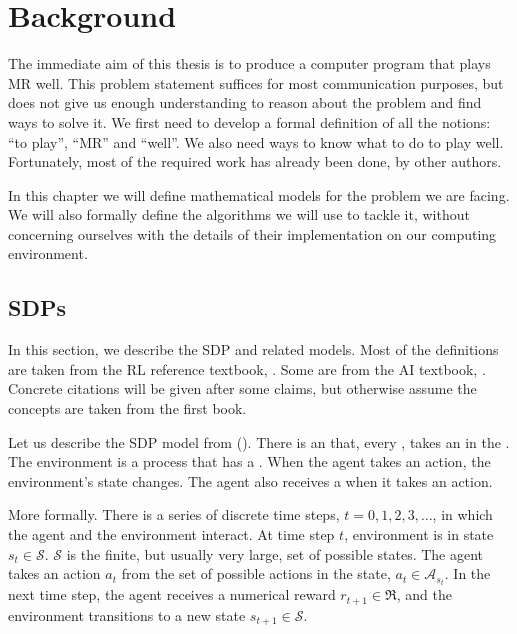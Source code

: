 \chapter{Background}
The immediate aim of this thesis is to produce a computer program that plays
\acl{MR} well. This problem statement suffices for most communication purposes,
but does not give us enough understanding to reason about the problem and find
ways to solve it. We first need to develop a formal definition of all the
notions: ``to play'', ``\acl{MR}'' and ``well''. We also need ways to know what
to do to play well. Fortunately, most of the required work has already been
done, by other authors.

In this chapter we will define mathematical models for the problem we are
facing. We will also formally define the algorithms we will use to tackle it,
without concerning ourselves with the details of their implementation on our
computing environment.

\section{\aclp{SDP}}
In this section, we describe the \acf{SDP} and related models. Most of the
definitions are taken from the \acl{RL} reference textbook,
\cite{sutton1998introduction}. Some are from the \ac{AI} textbook,
\cite{russell2009aima}. Concrete citations will be given after some claims, but
otherwise assume the concepts are taken from the first book.

Let us describe the \ac{SDP} model from
(\cite[Section~3.1]{sutton1998introduction}). There is an  that, every
, takes an  in the . The
environment is a process that has a . When the agent takes an
action, the environment's state changes. The agent also receives a 
when it takes an action.

More formally. There is a series of discrete time steps, $t=0,1,2,3,\dots$, in
which the agent and the environment interact. At time step $t$, environment is
in state $s_t \in \mathcal{S}$. $\mathcal{S}$ is the finite, but usually very
large, set of possible states. The agent takes an action $a_t$ from the set of
possible actions in the state, $a_t \in \mathcal{A}_{s_t}$. In the next time
step, the agent receives a numerical reward $r_{t+1} \in \mathfrak{R}$, and the
environment transitions to a new state $s_{t+1} \in \mathcal{S}$.

